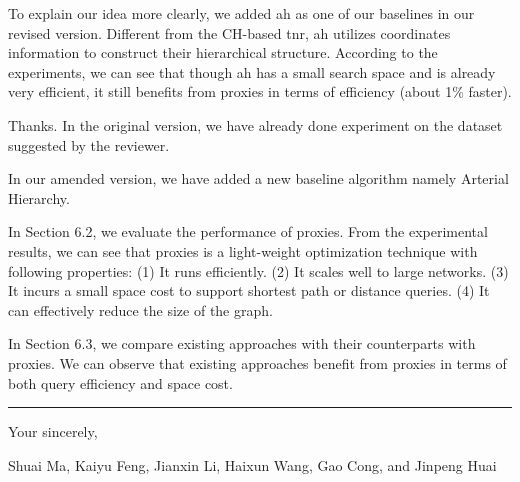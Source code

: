 \documentclass[11pt]{letter}
\newcommand{\vs}{\vspace{1ex}}
\newcommand{\svs}{\vspace{0.36ex}}
\newcommand{\ah}{{\sc ah}\xspace}
\newcommand{\tnr}{{\sc tnr}\xspace}
\begin{document}
To explain our idea more clearly, we added \ah as one of our baselines in our revised version. Different from the CH-based \tnr, \ah utilizes coordinates information to construct their hierarchical structure. According to the experiments, we can see that though \ah has a small search space and is already very efficient, it still benefits from proxies in terms of efficiency (about 1\% faster).



\vs{}
\svs

Thanks. In the original version, we have already done experiment on the dataset suggested by the reviewer.

In our amended version, we have added a new baseline algorithm namely Arterial Hierarchy.

In Section 6.2, we evaluate the performance of proxies. From the experimental results, we can see that proxies is a light-weight optimization technique with following properties: (1) It runs efficiently. (2) It scales well to large networks. (3) It incurs a small space cost to support shortest path or distance queries. (4) It can effectively reduce the size of the graph.

In Section 6.3, we compare existing approaches with their counterparts with proxies. We can observe that existing approaches benefit from proxies in terms of both query efficiency and space cost.



\vspace{3.6ex}
\hrule
\vspace{3.6ex}
\closing{Your sincerely,}

\vspace{-8ex}
Shuai Ma, Kaiyu Feng, Jianxin Li, Haixun Wang, Gao Cong, and Jinpeng Huai
\end{document}
